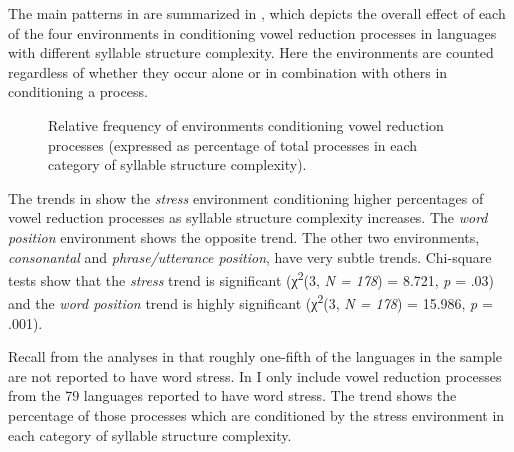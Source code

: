   The main patterns in  are summarized in , which depicts the overall effect of each of the four environments in conditioning vowel reduction processes in languages with different syllable structure complexity. Here the environments are counted regardless of whether they occur alone or in combination with others in conditioning a process.

  
\begin{figure}
\caption{\label{fig:6.2} Relative frequency of environments conditioning vowel reduction processes (expressed as percentage of total processes in each category of syllable structure complexity).}
\end{figure}

  The trends in  show the \textit{stress} environment conditioning higher percentages of vowel reduction processes as syllable structure complexity increases. The \textit{word position} environment shows the opposite trend. The other two environments, \textit{consonantal} and \textit{phrase/utterance position}, have very subtle trends. Chi-square tests show that the \textit{stress} trend is significant (χ\textsuperscript{2}(3, \textit{N = 178}) = 8.721, \textit{p} = .03) and the \textit{word position} trend is highly significant (χ\textsuperscript{2}(3, \textit{N = 178}) = 15.986, \textit{p} = .001).

  Recall from the analyses in  that roughly one-fifth of the languages in the sample are not reported to have word stress. In  I only include vowel reduction processes from the 79 languages reported to have word stress. The trend shows the percentage of those processes which are conditioned by the stress environment in each category of syllable structure complexity.

